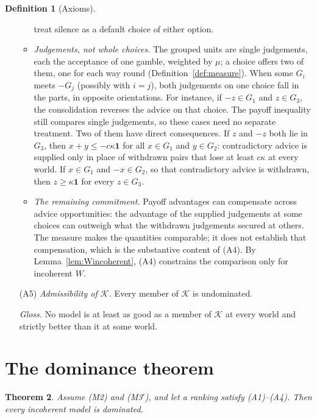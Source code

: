 \documentclass[11pt]{article}
\newcommand{\one}{\mathbf{1}}
\theoremstyle{plain}
\newtheorem{theorem}{Theorem}[section]
\theoremstyle{definition}
\newtheorem{definition}[theorem]{Definition}
\begin{document}
\begin{definition}[Axioms]
\begin{itemize}[leftmargin=3.2em]
\begin{itemize}[leftmargin=1.2em]
    treat silence as a default choice of either option.
    \item \emph{Judgements, not whole choices.} The grouped units are single judgements, each
    the acceptance of one gamble, weighted by $\mu$; a choice offers two of them, one for each
    way round (Definition~\ref{def:measure}). When some $G_i$ meets $-G_j$ (possibly with
    $i=j$), both judgements on one choice fall in the parts, in opposite orientations. For
    instance, if $-z\in G_1$ and $z\in G_3$, the consolidation reverses the advice on that
    choice. The payoff inequality still compares single judgements, so these cases need no
    separate treatment. Two of them have direct consequences. If $z$ and $-z$ both lie in
    $G_3$, then $x+y\le-c\kappa\one$ for all $x\in G_1$ and $y\in G_2$: contradictory advice is
    supplied only in place of withdrawn pairs that lose at least $c\kappa$ at every world. If
    $x\in G_1$ and $-x\in G_2$, so that contradictory advice is withdrawn, then $z\ge\kappa\one$
    for every $z\in G_3$.
    \item \emph{The remaining commitment.} Payoff advantages can compensate across advice
    opportunities: the advantage of the supplied judgements at some choices can outweigh what
    the withdrawn judgements secured at others. The measure makes the quantities comparable; it
    does not establish that compensation, which is the substantive content of (A4). By
    Lemma~\ref{lem:Wincoherent}, (A4) constrains the comparison only for incoherent $W$.
  \end{itemize}

  \item[(A5)] \emph{Admissibility of $\mathcal K$.} Every member of $\mathcal K$ is
  undominated.

  \emph{Gloss.} No model is at least as good as a member of $\mathcal K$ at every world and
  strictly better than it at some world.
\end{itemize}
\end{definition}

\section{The dominance theorem}\label{sec:dominance}

\begin{theorem}\label{thm:dominance}
Assume (M2) and (M3$'$), and let a ranking satisfy (A1)--(A4). Then every incoherent model is
dominated.
\end{theorem}
\end{document}
